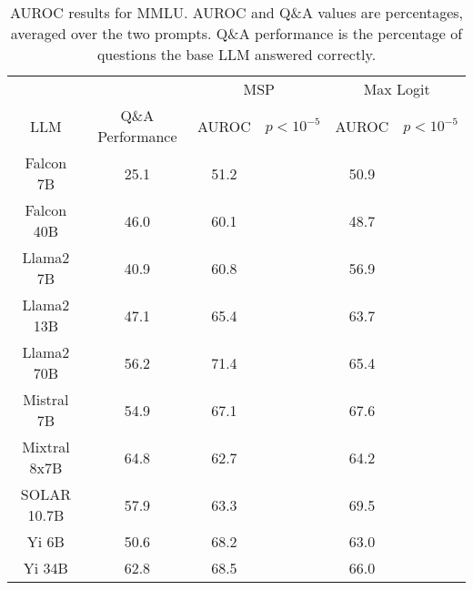 \begin{table*}
\centering
\begin{tabular}{c|c|c|c|c|c}
& & \multicolumn{2}{c|}{MSP} & \multicolumn{2}{c}{Max Logit} \\ 
LLM & Q\&A Performance & AUROC & $p < 10^{-5}$ & AUROC & $p < 10^{-5}$\\ \hline
Falcon 7B & 25.1 & 51.2 &  & 50.9 & \\
Falcon 40B & 46.0 & 60.1 &  & 48.7 & \\
Llama2 7B & 40.9 & 60.8 &  & 56.9 & \\
Llama2 13B & 47.1 & 65.4 &  & 63.7 & \\
Llama2 70B & 56.2 & 71.4 &  & 65.4 & \\
Mistral 7B & 54.9 & 67.1 &  & 67.6 & \\
Mixtral 8x7B & 64.8 & 62.7 &  & 64.2 & \\
SOLAR 10.7B & 57.9 & 63.3 &  & 69.5 & \\
Yi 6B & 50.6 & 68.2 &  & 63.0 & \\
Yi 34B & 62.8 & 68.5 &  & 66.0 & \\
\hline
\end{tabular}
\caption{AUROC results for MMLU. AUROC and Q\&A values are percentages, averaged over the two prompts. Q\&A performance is the percentage of questions the base LLM answered correctly.}
\label{tab:mmlu_auroc}
\end{table*}
